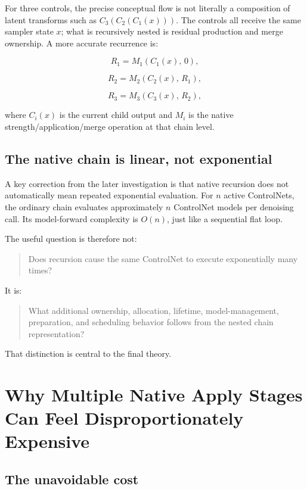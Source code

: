 \documentclass[11pt]{article}
\begin{document}
For three controls, the precise conceptual flow is not literally a composition of latent transforms such as $C_3(C_2(C_1(x)))$. The controls all receive the same sampler state $x$; what is recursively nested is residual production and merge ownership. A more accurate recurrence is:

\[
R_1 = M_1\!\left(C_1(x),\,0\right),
\]

\[
R_2 = M_2\!\left(C_2(x),\,R_1\right),
\]

\[
R_3 = M_3\!\left(C_3(x),\,R_2\right),
\]

where $C_i(x)$ is the current child output and $M_i$ is the native strength/application/merge operation at that chain level.

\subsection{The native chain is linear, not exponential}

A key correction from the later investigation is that native recursion does not automatically mean repeated exponential evaluation. For $n$ active ControlNets, the ordinary chain evaluates approximately $n$ ControlNet models per denoising call. Its model-forward complexity is $O(n)$, just like a sequential flat loop.

The useful question is therefore not:

\begin{quote}
Does recursion cause the same ControlNet to execute exponentially many times?
\end{quote}

It is:

\begin{quote}
What additional ownership, allocation, lifetime, model-management, preparation, and scheduling behavior follows from the nested chain representation?
\end{quote}

That distinction is central to the final theory.

\section{Why Multiple Native Apply Stages Can Feel Disproportionately Expensive}

\subsection{The unavoidable cost}
\end{document}
